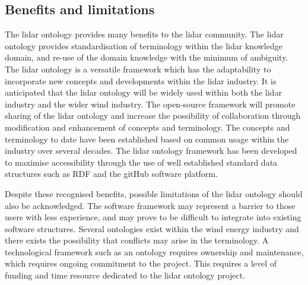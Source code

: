 \documentclass[remotesensing,article,submit,pdftex,moreauthors]{Definitions/mdpi}
\begin{document}
\subsection{Benefits and limitations}
The lidar ontology provides many benefits to the lidar community.
The lidar ontology provides standardisation of terminology within the lidar knowledge domain, and re-use of the domain knowledge with the minimum of ambiguity.
The lidar ontology is a versatile framework which has the adaptability to incorporate new concepts and developments within the lidar industry.
It is anticipated that the lidar ontology will be widely used within both the lidar industry and the wider wind industry.
The open-source framework will promote sharing of the lidar ontology and increase the possibility of collaboration through modification and enhancement of concepts and terminology. 
The concepts and terminology to date have been established based on common usage within the industry over several decades.
The lidar ontology framework has been developed to maximise accessibility through the use of well established standard data structures such as RDF and the gitHub software platform.

Despite these recognised benefits, possible limitations of the lidar ontology should also be acknowledged.
The software framework may represent a barrier to those users with less experience, and may prove to be difficult to integrate into existing software structures.
Several ontologies exist within the wind energy industry and there exists the possibility that conflicts may arise in the terminology.
A technological framework such as an ontology requires ownership and maintenance, which requires ongoing commitment to the project.
This requires a level of funding and time resource dedicated to the lidar ontology project. 



\end{document}
